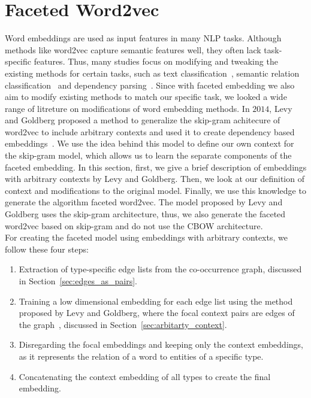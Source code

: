 \section{Faceted Word2vec}\label{sec:faceted_word2vec}
Word embeddings are used as input features in many NLP tasks. Although methods like word2vec capture semantic features well, they often lack task-specific features. Thus, many studies focus on modifying and tweaking the existing methods for certain tasks, such as text classification~, semantic relation classification~ and dependency parsing~. Since with faceted embedding we also aim to modify existing methods to match our specific task, we looked a wide range of litreture on modifications of word embedding methods. In $2014$, Levy and Goldberg proposed a method to generalize the skip-gram achitecure of word2vec to include arbitrary contexts and used it to create dependency based embeddings~. We use the idea behind this model to define our own context for the skip-gram model, which allows us to learn the separate components of the faceted embedding. In this section, first, we give a brief description of embeddings with arbitrary contexts by Levy and Goldberg. Then, we look at our definition of context and modifications to the original model. Finally, we use this knowledge to generate the algorithm faceted word2vec. The model proposed by Levy and Goldberg uses the skip-gram architecture, thus, we also generate the faceted word2vec based on skip-gram and do not use the CBOW architecture.\\
For creating the faceted model using embeddings with arbitrary contexts, we follow these four steps: 
\begin{enumerate}        
 \item Extraction of type-specific edge lists from the co-occurrence graph, discussed in Section~\ref{sec:edges_as_pairs}.
 \item Training a low dimensional embedding for each edge list using the method proposed by  Levy and Goldberg, where the focal context pairs are edges of the graph~, discussed in Section~\ref{sec:arbitarty_context}.
 \item Disregarding the focal embeddings and keeping only the context embeddings, as it represents the relation of a word to entities of a specific type. 
 \item Concatenating the context embedding of all types to create the final embedding. 
 \end{enumerate}
